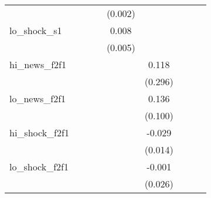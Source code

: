 {\begin{tabular}{l*{8}{c}}
            &                     &                     &                     &     (0.002)         &                     &                     &                     &                     \\
\addlinespace
lo\_shock\_s1 &                     &                     &                     &       0.008         &                     &                     &                     &                     \\
            &                     &                     &                     &     (0.005)         &                     &                     &                     &                     \\
\addlinespace
hi\_news\_f2f1&                     &                     &                     &                     &       0.118         &                     &                     &                     \\
            &                     &                     &                     &                     &     (0.296)         &                     &                     &                     \\
\addlinespace
lo\_news\_f2f1&                     &                     &                     &                     &       0.136         &                     &                     &                     \\
            &                     &                     &                     &                     &     (0.100)         &                     &                     &                     \\
\addlinespace
hi\_shock\_f2f1&                     &                     &                     &                     &      -0.029\sym{**} &                     &                     &                     \\
            &                     &                     &                     &                     &     (0.014)         &                     &                     &                     \\
\addlinespace
lo\_shock\_f2f1&                     &                     &                     &                     &      -0.001         &                     &                     &                     \\
            &                     &                     &                     &                     &     (0.026)         &                     &                     &                     \\

\end{tabular}}
